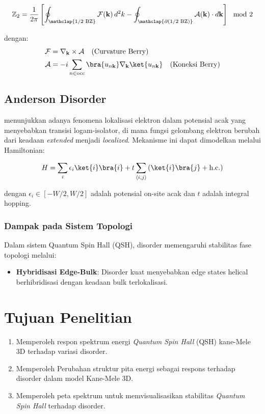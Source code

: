 \begin{equation}
\mathbb{Z}_2 = \frac{1}{2\pi}\left[ \oint_{\mathclap{\text{1/2 BZ}}} \mathcal{F}(\mathbf{k}) \, d^2k - \oint_{\mathclap{\partial(\text{1/2 BZ})}} \mathcal{A}(\mathbf{k}) \cdot d\mathbf{k} \right] \mod 2
\end{equation}

dengan:
\begin{align}
\mathcal{F} &= \nabla_{\mathbf{k}} \times \mathcal{A} \quad \text{(Curvature Berry)} \\
\mathcal{A} &= -i \sum_{n \in \text{occ}} \bra{u_{n\mathbf{k}}} \nabla_{\mathbf{k}} \ket{u_{n\mathbf{k}}} \quad \text{(Koneksi Berry)}
\end{align}
\subsection{Anderson Disorder}
\parencite{PhysRev.109.1492} menunjukkan adanya fenomena lokalisasi elektron dalam potensial acak yang menyebabkan transisi logam-isolator, di mana fungsi gelombang elektron berubah dari keadaan \textit{extended} menjadi \textit{localized}. Mekanisme ini dapat dimodelkan melalui Hamiltonian:

\begin{equation}
H = \sum_i \epsilon_i \ket{i}\bra{i} + t \sum_{\langle i,j \rangle} \left( \ket{i}\bra{j} + \text{h.c.} \right)
\label{eq:anderson_hamiltonian}
\end{equation}

dengan $\epsilon_i \in [-W/2, W/2]$ adalah potensial on-site acak dan $t$ adalah integral hopping.

\subsubsection{Dampak pada Sistem Topologi}
Dalam sistem Quantum Spin Hall (QSH), disorder memengaruhi stabilitas fase topologi melalui:

\begin{itemize}
    \item \textbf{Hybridisasi Edge-Bulk}: Disorder kuat menyebabkan edge states helical berhibridisasi dengan keadaan bulk terlokalisasi.

\end{itemize}

\section{Tujuan Penelitian}
\begin{enumerate} \item Memperoleh respon spektrum energi \textit{Quantum Spin Hall} (QSH) kane-Mele 3D terhadap variasi disorder.  \item Memperoleh Perubahan struktur pita energi sebagai respons terhadap disorder dalam model Kane-Mele 3D. \item Memperoleh peta spektrum untuk memvisualisasikan stabilitas \textit{Quantum Spin Hall} terhadap disorder. \end{enumerate}
